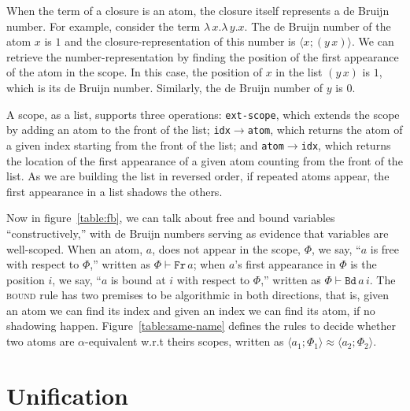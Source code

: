 \documentclass[a4paper,UKenglish]{lipics-v2016}
\newcommand{\clos}[2] {
  \langle #1; #2 \rangle
}
\newcommand{\aeq}[4] {
  \clos{#1}{#2} \approx \clos{#3}{#4}
}
\newcommand*{\transname}[1]{\textsc{#1}}
\begin{document}
When the term of a closure is an atom, the closure itself represents a
de Bruijn number.  For example, consider the term
$\lambda\,x.\lambda\,y.x$. The de Bruijn number of the atom $x$ is $1$
and the closure-representation of this number is $\clos{x}{(y\,x)}$.
We can retrieve the number-representation by finding the position of
the first appearance of the atom in the scope. In this case, the
position of $x$ in the list $(y\,x)$ is $1$, which is its de Bruijn
number. Similarly, the de Bruijn number of $y$ is $0$.

A scope, as a list, supports three operations: \texttt{ext-scope},
which extends the scope by adding an atom to the front of the list;
\texttt{idx$\rightarrow$atom}, which returns the atom of a given index
starting from the front of the list; and
\texttt{atom$\rightarrow$idx}, which returns the location of the first
appearance of a given atom counting from the front of the list.  As we
are building the list in reversed order, if repeated atoms appear, the
first appearance in a list shadows the others.

Now in figure~\ref{table:fb}, we can talk about free and bound
variables ``constructively,'' with de Bruijn numbers serving as
evidence that variables are well-scoped.  When an atom, $a$, does not
appear in the scope, $\Phi$, we say, ``$a$ is free with respect to
$\Phi$,'' written as $\Phi \vdash \texttt{Fr}\, a$; when $a$'s first
appearance in $\Phi$ is the position $i$, we say, ``$a$ is bound at
$i$ with respect to $\Phi$,'' written as $\Phi \vdash \texttt{Bd}\,
a\,i$.  The \transname{bound} rule has two premises to be algorithmic
in both directions, that is, given an atom we can find its index and
given an index we can find its atom, if no shadowing happen.
Figure~\ref{table:same-name} defines the rules to decide whether two
atoms are $\alpha$-equivalent w.r.t theirs scopes, written as
$\aeq{a_1}{\Phi_1}{a_2}{\Phi_2}$.

\pagebreak

\section{Unification}
\end{document}
